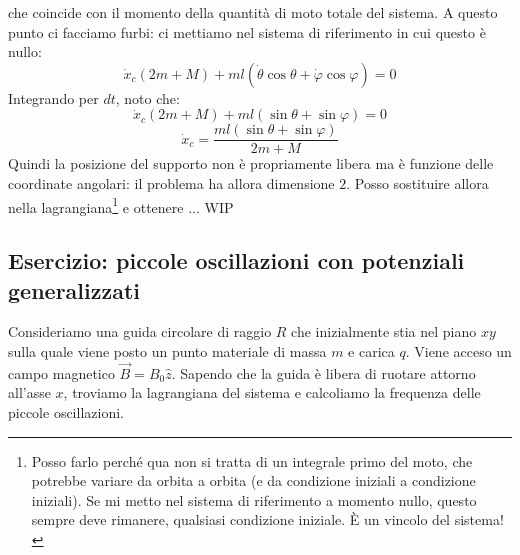 \documentclass[a4paper,openany]{article}
\begin{document}
	che coincide con il momento della quantità di moto totale del sistema. A questo punto ci facciamo furbi: ci mettiamo nel sistema di riferimento in cui questo è nullo: 
	$$
	\dot{x}_c(2m+M) + ml(\dot\theta\cos\theta+\dot\varphi\cos\varphi)=0
	$$
	Integrando per $dt$, noto che:
	$$
	\dot{x}_c(2m+M) + ml(\sin\theta+\sin\varphi) =0
	$$
	$$
	\dot{x}_c = \dfrac{ml(\sin\theta+\sin\varphi) }{2m+M}
	$$
	Quindi la posizione del supporto non è propriamente libera ma è funzione delle coordinate angolari: il problema ha allora dimensione $2$. Posso sostituire allora nella lagrangiana\footnote{Posso farlo perché qua non si tratta di un integrale primo del moto, che potrebbe variare da orbita a orbita (e da condizione iniziali a condizione iniziali). Se mi metto nel sistema di riferimento a momento nullo, questo sempre deve rimanere, qualsiasi condizione iniziale. È un vincolo del sistema!} e ottenere ... 	WIP
	\subsection{Esercizio: piccole oscillazioni con potenziali generalizzati}
	Consideriamo una guida circolare di raggio $R$ che inizialmente stia nel piano $xy$ sulla quale viene posto un punto materiale di massa $m$ e carica $q$. Viene acceso un campo magnetico $\vec{B} = B_0\hat{z}$. Sapendo che la guida è libera di ruotare attorno all'asse $x$, troviamo la lagrangiana del sistema e calcoliamo la frequenza delle piccole oscillazioni. 
	
\end{document}
